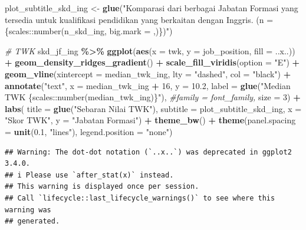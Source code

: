 \documentclass[
]{article}
\newenvironment{Shaded}{\begin{snugshade}}{\end{snugshade}}
\newcommand{\AttributeTok}[1]{\textcolor[rgb]{0.13,0.29,0.53}{#1}}
\newcommand{\CommentTok}[1]{\textcolor[rgb]{0.56,0.35,0.01}{\textit{#1}}}
\newcommand{\DecValTok}[1]{\textcolor[rgb]{0.00,0.00,0.81}{#1}}
\newcommand{\FloatTok}[1]{\textcolor[rgb]{0.00,0.00,0.81}{#1}}
\newcommand{\FunctionTok}[1]{\textcolor[rgb]{0.13,0.29,0.53}{\textbf{#1}}}
\newcommand{\NormalTok}[1]{#1}
\newcommand{\OtherTok}[1]{\textcolor[rgb]{0.56,0.35,0.01}{#1}}
\newcommand{\SpecialCharTok}[1]{\textcolor[rgb]{0.81,0.36,0.00}{\textbf{#1}}}
\newcommand{\StringTok}[1]{\textcolor[rgb]{0.31,0.60,0.02}{#1}}
\begin{document}
\begin{Shaded}
\begin{Highlighting}[]
\NormalTok{plot\_subtitle\_skd\_ing }\OtherTok{\textless{}{-}} \FunctionTok{glue}\NormalTok{(}\StringTok{"Komparasi dari berbagai Jabatan Formasi yang}
\StringTok{                      tersedia untuk kualifikasi pendidikan yang berkaitan}
\StringTok{                      dengan \textquotesingle{}Inggris\textquotesingle{}. (n = \{scales::number(n\_skd\_ing, big.mark = \textquotesingle{},\textquotesingle{})\})"}\NormalTok{)}

\CommentTok{\# TWK}
\NormalTok{skd\_jf\_ing }\SpecialCharTok{\%\textgreater{}\%} 
  \FunctionTok{ggplot}\NormalTok{(}\FunctionTok{aes}\NormalTok{(}\AttributeTok{x =}\NormalTok{ twk, }\AttributeTok{y =}\NormalTok{ job\_position, }\AttributeTok{fill =}\NormalTok{ ..x..)) }\SpecialCharTok{+}
  \FunctionTok{geom\_density\_ridges\_gradient}\NormalTok{() }\SpecialCharTok{+}
  \FunctionTok{scale\_fill\_viridis}\NormalTok{(}\AttributeTok{option =} \StringTok{"E"}\NormalTok{) }\SpecialCharTok{+}
  \FunctionTok{geom\_vline}\NormalTok{(}\AttributeTok{xintercept =}\NormalTok{ median\_twk\_ing,}
             \AttributeTok{lty =} \StringTok{"dashed"}\NormalTok{,}
             \AttributeTok{col =} \StringTok{"black"}\NormalTok{) }\SpecialCharTok{+}
  \FunctionTok{annotate}\NormalTok{(}\StringTok{"text"}\NormalTok{, }
           \AttributeTok{x =}\NormalTok{ median\_twk\_ing }\SpecialCharTok{+} \DecValTok{16}\NormalTok{,}
           \AttributeTok{y =} \FloatTok{10.2}\NormalTok{,}
           \AttributeTok{label =} \FunctionTok{glue}\NormalTok{(}\StringTok{"Median TWK}
\StringTok{                        \{scales::number(median\_twk\_ing)\}"}\NormalTok{),}
           \CommentTok{\#family = font\_family,}
           \AttributeTok{size =} \DecValTok{3}\NormalTok{) }\SpecialCharTok{+}
  \FunctionTok{labs}\NormalTok{(}
    \AttributeTok{title =} \FunctionTok{glue}\NormalTok{(}\StringTok{"Sebaran Nilai TWK"}\NormalTok{),}
    \AttributeTok{subtitle =}\NormalTok{ plot\_subtitle\_skd\_ing,}
    \AttributeTok{x =} \StringTok{"Skor TWK"}\NormalTok{,}
    \AttributeTok{y =} \StringTok{"Jabatan Formasi"}\NormalTok{) }\SpecialCharTok{+}
  \FunctionTok{theme\_bw}\NormalTok{() }\SpecialCharTok{+}
  \FunctionTok{theme}\NormalTok{(}\AttributeTok{panel.spacing =} \FunctionTok{unit}\NormalTok{(}\FloatTok{0.1}\NormalTok{, }\StringTok{"lines"}\NormalTok{),}
        \AttributeTok{legend.position =} \StringTok{"none"}\NormalTok{) }
\end{Highlighting}
\end{Shaded}

\begin{verbatim}
## Warning: The dot-dot notation (`..x..`) was deprecated in ggplot2 3.4.0.
## i Please use `after_stat(x)` instead.
## This warning is displayed once per session.
## Call `lifecycle::last_lifecycle_warnings()` to see where this warning was
## generated.
\end{verbatim}
\end{document}
